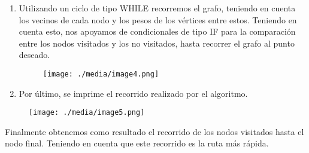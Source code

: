 \documentclass[12pt]{article}
\renewcommand{\_}{\kern-1.5pt\textunderscore\kern-1.5pt}
\begin{document}
\begin{enumerate}
\vspace{\baselineskip}

\vspace{\baselineskip}

\vspace{\baselineskip}

\vspace{\baselineskip}
	\item Utilizando un ciclo de tipo WHILE recorremos el grafo, teniendo en cuenta los vecinos de cada nodo y los pesos de los vértices entre estos. Teniendo en cuenta esto, nos apoyamos de condicionales de tipo IF para la comparación entre los nodos visitados y los no visitados, hasta recorrer el grafo al punto deseado.\par




\begin{figure}[H]
	\begin{Center}
		\texttt{[image: ./media/image4.png]}
	\end{Center}
\end{figure}



\par


\vspace{\baselineskip}
	\item Por último, se imprime el recorrido realizado por el algoritmo.
\end{enumerate}\par




\begin{figure}[H]
	\begin{Center}
		\texttt{[image: ./media/image5.png]}
	\end{Center}
\end{figure}



\par

Finalmente obtenemos como resultado el recorrido de los nodos visitados hasta el nodo final. Teniendo en cuenta que este recorrido es la ruta más rápida.\par
\end{document}

